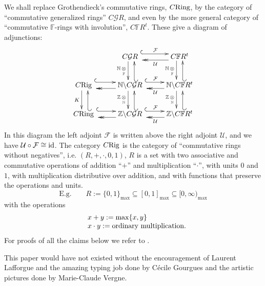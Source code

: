 \documentclass[leqno]{article}
\numberwithin{equation}{section}
\begin{document}
\smallskip

We shall replace Grothendieck's commutative rings, $C{\rm Ring}$, by the category of ``commutative generalized rings'' $C {\mathcal G} R$, and even by the more general category of ``commutative ${\mathbb F}$-rings with involution'', $C{\mathbb F} R^t$. These give a diagram of adjunctions:
\begin{equation}
\label{eq3}
\xymatrix{
&C {\mathcal G} R \ \ar@{^{(}->}@<1ex>[r]^{\mathcal F} \ar@<-1ex>[d]_{{\mathbb N} \, \underset{\mathbb F}{\otimes}} &C{\mathbb F} R^t \ar@{->>}@<1ex>[l]^{\mathcal U} \ar@<-1ex>[d]_{{\mathbb N} \, \underset{\mathbb F}{\otimes}} \\
C{\rm Rig} \ \ar@{^{(}->}@<1ex>[r] \ar@<-1ex>[d]_K &{\mathbb N} \backslash C {\mathcal G} R \ar@{_{(}->}@<-1ex>[u] \ar@{->>}@<1ex>[l] \ \ar@{^{(}->}@<1ex>[r]^{\mathcal F} \ar@<-1ex>[d]_{{\mathbb Z} \, \underset{\mathbb N}{\otimes}} &{\mathbb N} \backslash C{\mathbb F} R^t \ar@{_{(}->}@<-1ex>[u] \ar@{->>}@<1ex>[l]^{\mathcal U} \ar@<-1ex>[d]_{{\mathbb Z} \, \underset{\mathbb N}{\otimes}} \\
C{\rm Ring} \ \ar@{^{(}->}@<1ex>[r] \ar@{_{(}->}@<-1ex>[u] &{\mathbb Z} \backslash C {\mathcal G} R \ar@{_{(}->}@<-1ex>[u] \ar@{->>}@<1ex>[l] \ \ar@{^{(}->}@<1ex>[r]^{\mathcal F} &{\mathbb Z} \backslash C{\mathbb F} R^t \ar@{->>}@<1ex>[l]^{\mathcal U} \ar@{_{(}->}@<-1ex>[u]
}
\end{equation}
In this diagram the left adjoint ${\mathcal F}$ is written above the right adjoint ${\mathcal U}$, and we have ${\mathcal U} \circ {\mathcal F} \cong {\rm id}$. The category $C{\rm Rig}$ is the category of ``commutative rings without negatives'', i.e. $(R , + , \cdot , 0,1)$, $R$ is a set with two associative and commutative operations of addition ``$+$'' and multiplication ``$\cdot$'', with units $0$ and $1$, with multiplication distributive over addition, and with functions that preserve the operations and units.
\begin{equation}
\label{eq4}
\mbox{E.g.} \qquad R := \{0,1\}_{\max} \subseteq [0,1]_{\max} \subseteq [0,\infty)_{\max}
\end{equation}
with the operations
$$
\begin{matrix}
&x + y := \max \{ x,y \} \hfill \\
&x \cdot y := \mbox{ordinary multiplication.}
\end{matrix}
$$
For proofs of all the claims below we refer to \cite{13}.

\smallskip

This paper would have not existed without the encouragement of Laurent Lafforgue and the amazing typing job done by C\'ecile Gourgues and the artistic pictures done by Marie-Claude Vergne.
\end{document}
